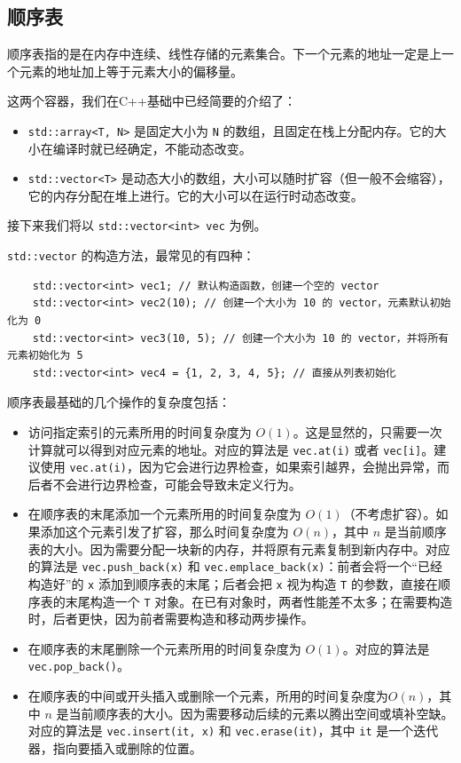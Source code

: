 \subsection{顺序表}

顺序表指的是在内存中连续、线性存储的元素集合。下一个元素的地址一定是上一个元素的地址加上等于元素大小的偏移量。

这两个容器，我们在C++基础中已经简要的介绍了：
\begin{itemize}
    \item \verb|std::array<T, N>| 是固定大小为 \verb|N| 的数组，且固定在栈上分配内存。它的大小在编译时就已经确定，不能动态改变。
    \item \verb|std::vector<T>| 是动态大小的数组，大小可以随时扩容（但一般不会缩容），它的内存分配在堆上进行。它的大小可以在运行时动态改变。
\end{itemize}
接下来我们将以 \verb|std::vector<int> vec| 为例。

\verb|std::vector| 的构造方法，最常见的有四种：
\begin{verbatim}
    std::vector<int> vec1; // 默认构造函数，创建一个空的 vector
    std::vector<int> vec2(10); // 创建一个大小为 10 的 vector，元素默认初始化为 0
    std::vector<int> vec3(10, 5); // 创建一个大小为 10 的 vector，并将所有元素初始化为 5
    std::vector<int> vec4 = {1, 2, 3, 4, 5}; // 直接从列表初始化
\end{verbatim}

顺序表最基础的几个操作的复杂度包括：
\begin{itemize}
    \item 访问指定索引的元素所用的时间复杂度为 $O(1)$。这是显然的，只需要一次计算就可以得到对应元素的地址。对应的算法是 \verb|vec.at(i)| 或者 \verb|vec[i]|。建议使用 \verb|vec.at(i)|，因为它会进行边界检查，如果索引越界，会抛出异常，而后者不会进行边界检查，可能会导致未定义行为。
    \item 在顺序表的末尾添加一个元素所用的时间复杂度为 $O(1)$（不考虑扩容）。如果添加这个元素引发了扩容，那么时间复杂度为 $O(n)$，其中 $n$ 是当前顺序表的大小。因为需要分配一块新的内存，并将原有元素复制到新内存中。对应的算法是 \verb|vec.push_back(x)| 和 \verb|vec.emplace_back(x)|：前者会将一个“已经构造好”的 \verb|x| 添加到顺序表的末尾；后者会把 \verb|x| 视为构造 \verb|T| 的参数，直接在顺序表的末尾构造一个 \verb|T| 对象。在已有对象时，两者性能差不太多；在需要构造时，后者更快，因为前者需要构造和移动两步操作。
    \item 在顺序表的末尾删除一个元素所用的时间复杂度为 $O(1)$。对应的算法是 \verb|vec.pop_back()|。
    \item 在顺序表的中间或开头插入或删除一个元素，所用的时间复杂度为$O(n)$，其中 $n$ 是当前顺序表的大小。因为需要移动后续的元素以腾出空间或填补空缺。对应的算法是 \verb|vec.insert(it, x)| 和 \verb|vec.erase(it)|，其中 \verb|it| 是一个迭代器，指向要插入或删除的位置。
\end{itemize}

